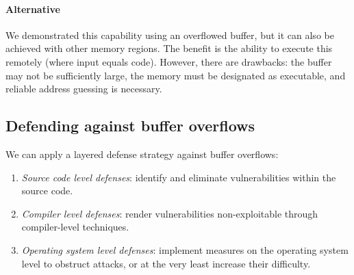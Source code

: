 \paragraph*{Alternative}
We demonstrated this capability using an overflowed buffer, but it can also be achieved with other memory regions.
The benefit is the ability to execute this remotely (where input equals code). 
However, there are drawbacks: the buffer may not be sufficiently large, the memory must be designated as executable, and reliable address guessing is necessary.

\subsection{Defending against buffer overflows}
We can apply a layered defense strategy against buffer overflows: 
\begin{enumerate}
    \item \textit{Source code level defenses}: identify and eliminate vulnerabilities within the source code.
    \item \textit{Compiler level defenses}: render vulnerabilities non-exploitable through compiler-level techniques.
    \item \textit{Operating system level defenses}: implement measures on the operating system level to obstruct attacks, or at the very least increase their difficulty.
\end{enumerate}







